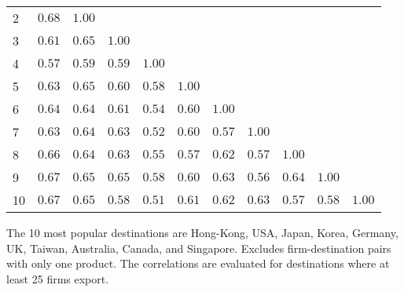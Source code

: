\documentclass{article}
\begin{document}
\begin{table}[h]
{\begin{threeparttable}
\begin{tabular}{lrrrrrrrrrr}
2 & $0.68$   & $1.00$     &             &             &              &            &               &            &             &                        \\  
3 & $0.61$   & $0.65$     & $1.00$    &             &              &            &               &            &             &                        \\  
4 & $0.57$   & $0.59$     & $0.59$    &  $1.00$   &              &            &               &            &             &                         \\  
5 & $0.63$   & $0.65$     & $0.60$    &  $0.58$   & $1.00$     &            &               &            &             &                         \\  
6 & $0.64$   & $0.64$     & $0.61$    &  $0.54$   & $0.60$     &  $1.00$  &               &            &             &                         \\  
7 & $0.63$   & $0.64$     & $0.63$    &  $0.52$   & $0.60$     &  $0.57$  &  $1.00$     &            &             &                         \\  
8 & $0.66$   & $0.64$     & $0.63$    &  $0.55$   & $0.57$     &  $0.62$  &  $0.57$     & $1.00$   &             &                         \\  
9 & $0.67$   & $0.65$     & $0.65$    &  $0.58$   & $0.60$     &  $0.63$  &  $0.56$     & $0.64$   & $1.00$    &                         \\  
10 & $0.67$ & $0.65$    & $0.58$   &  $0.51$  & $0.61$    &  $0.62$ &  $0.63$    & $0.57$  & $0.58$   & $1.00$ \\  
\hline
\end{tabular}
\begin{tablenotes}
\small
\item  \noindent  \footnotesize{The 10 most popular destinations are Hong-Kong, USA, Japan, Korea, Germany, UK, Taiwan, Australia, Canada, and Singapore. Excludes firm-destination pairs with only one product. The correlations are evaluated for destinations where at least 25 firms export.}
\end{tablenotes}
\end{threeparttable}
}
\end{table}
\end{document}
